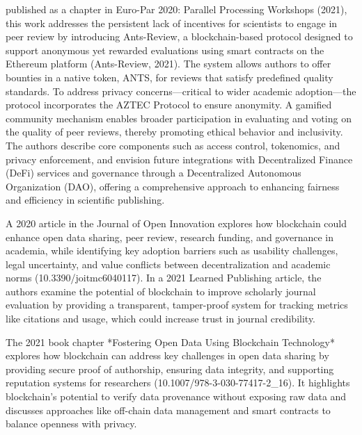 \documentclass{article}
\begin{document}
\cite{trovo_ants-review_2021} published as a chapter in Euro-Par 2020: Parallel Processing Workshops (2021), this work addresses the persistent lack of incentives for scientists to engage in peer review by introducing Ants-Review, a blockchain-based protocol designed to support anonymous yet rewarded evaluations using smart contracts on the Ethereum platform (Ants-Review, 2021). The system allows authors to offer bounties in a native token, ANTS, for reviews that satisfy predefined quality standards. To address privacy concerns—critical to wider academic adoption—the protocol incorporates the AZTEC Protocol to ensure anonymity. A gamified community mechanism enables broader participation in evaluating and voting on the quality of peer reviews, thereby promoting ethical behavior and inclusivity. The authors describe core components such as access control, tokenomics, and privacy enforcement, and envision future integrations with Decentralized Finance (DeFi) services and governance through a Decentralized Autonomous Organization (DAO), offering a comprehensive approach to enhancing fairness and efficiency in scientific publishing.

\cite{kosmarski_blockchain_2020} A 2020 article in the Journal of Open Innovation explores how blockchain could enhance open data sharing, peer review, research funding, and governance in academia, while identifying key adoption barriers such as usability challenges, legal uncertainty, and value conflicts between decentralization and academic norms (10.3390/joitmc6040117). In a 2021 Learned Publishing article, the authors examine the potential of blockchain to improve scholarly journal evaluation by providing a transparent, tamper-proof system for tracking metrics like citations and usage, which could increase trust in journal credibility.


The 2021 book chapter *Fostering Open Data Using Blockchain Technology* explores how blockchain can address key challenges in open data sharing by providing secure proof of authorship, ensuring data integrity, and supporting reputation systems for researchers (10.1007/978-3-030-77417-2_16). It highlights blockchain’s potential to verify data provenance without exposing raw data and discusses approaches like off-chain data management and smart contracts to balance openness with privacy.
\end{document}
